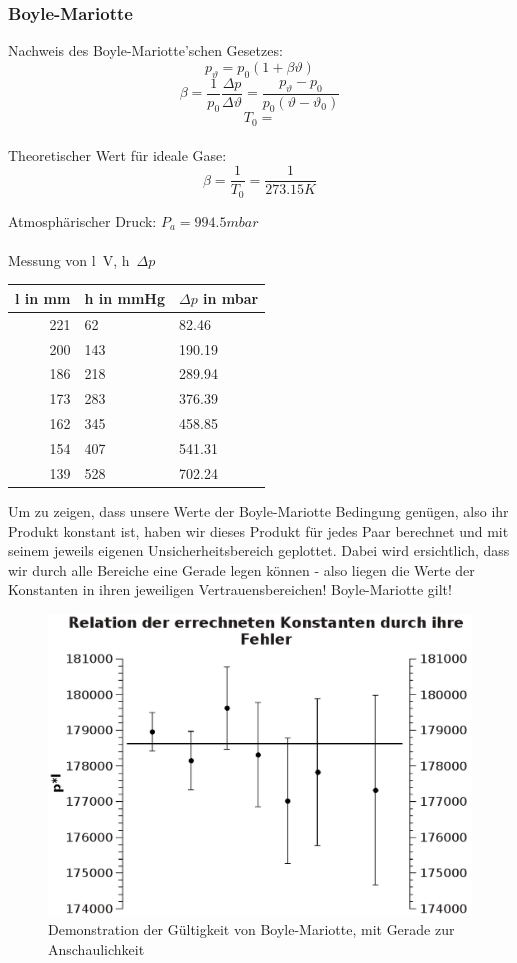 \documentclass{article}
\begin{document}
\subsubsection{Boyle-Mariotte}
Nachweis des Boyle-Mariotte'schen Gesetzes:\\

$$p_{\vartheta}=p_0 (1+\beta \vartheta)$$
$$\beta=\frac{1}{p_0}\frac{\Delta p}{\Delta \vartheta}=\frac{p_{\vartheta}-p_0}{p_0(\vartheta - \vartheta_0)}$$
$$T_0=$$
\\
Theoretischer Wert für ideale Gase:\\
$$\beta=\frac{1}{T_0}=\frac{1}{273.15K}$$



Atmosphärischer Druck: $P_a=994.5mbar$\\
\\
Messung von l~V, h~$\Delta p$
\begin{center}
\begin{tabular}{r|l|l}
l in mm & h in mmHg & $\Delta p$ in mbar\\
\hline
221 & 62 & 82.46\\
200 & 143 & 190.19\\
186 & 218 & 289.94\\
173 & 283 & 376.39\\
162 & 345 & 458.85\\
154 & 407 & 541.31\\
139 & 528 & 702.24\\
\end{tabular}
\end{center}
Um zu zeigen, dass unsere Werte der Boyle-Mariotte Bedingung genügen, also ihr Produkt konstant ist, haben wir dieses Produkt für jedes Paar berechnet und mit seinem jeweils eigenen Unsicherheitsbereich geplottet. Dabei wird ersichtlich, dass wir durch alle Bereiche eine Gerade legen können - also liegen die Werte der Konstanten in ihren jeweiligen Vertrauensbereichen! Boyle-Mariotte gilt!
\begin{center}
\begin{figure}
\caption{Demonstration der Gültigkeit von Boyle-Mariotte, mit Gerade zur Anschaulichkeit}
\includegraphics[scale=0.7]{Graph1.eps}
\end{figure}
\end{center}
\end{document}

